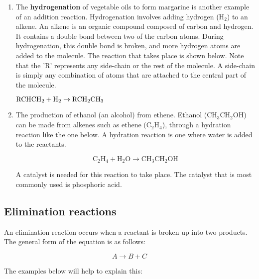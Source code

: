 \begin{enumerate}
\item{The \textbf{hydrogenation} of vegetable oils to form margarine is another example of an addition reaction. Hydrogenation involves adding hydrogen (H$_{2}$) to an alkene. An alkene is an organic compound composed of carbon and hydrogen. It contains a double bond between two of the carbon atoms. During hydrogenation, this double bond is broken, and more hydrogen atoms are added to the molecule. The reaction that takes place is shown below. Note that the 'R' represents any side-chain or the rest of the molecule. A side-chain is simply any combination of atoms that are attached to the central part of the molecule.

\begin{center}
$\rm{RCHCH_{2} + H_{2} \rightarrow RCH_{2}CH_{3}}$
\end{center}
}

\item{The production of ethanol (an alcohol) from ethene. Ethanol (CH$_{3}$CH$_{2}$OH) can be made from alkenes such as ethene (C$_{2}$H$_{4}$), through a hydration reaction like the one below. A hydration reaction is one where water is added to the reactants.

\begin{equation*}
\text{C}_{2}\text{H}_{4} + \text{H}_{2}\text{O}  \rightarrow \text{CH}_{3}\text{CH}_{2}\text{OH}
\end{equation*}

A catalyst is needed for this reaction to take place. The catalyst that is most commonly used is phosphoric acid.
}

\end{enumerate}


\subsection{Elimination reactions}

An elimination reaction occurs when a reactant is broken up into two products. The general form of the equation is as follows:

\begin{equation*}
A \rightarrow B + C
\end{equation*}

The examples below will help to explain this:

